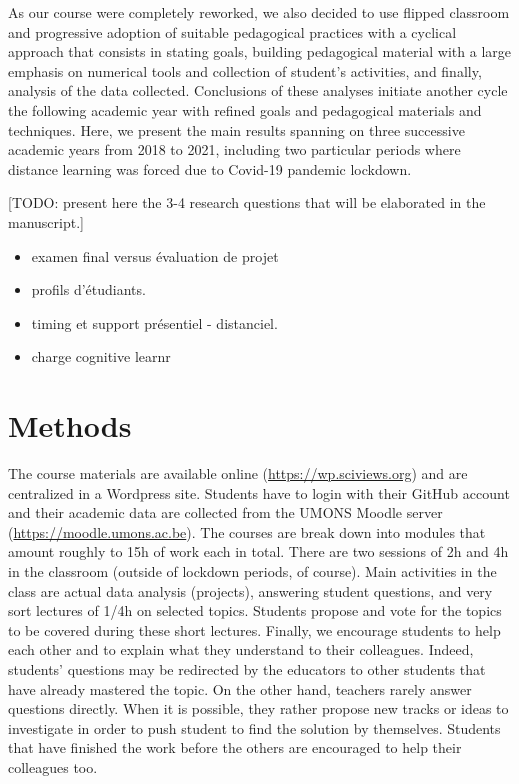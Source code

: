 \documentclass[
]{article}
\begin{document}
As our course were completely reworked, we also decided to use flipped
classroom and progressive adoption of suitable pedagogical practices
with a cyclical approach that consists in stating goals, building
pedagogical material with a large emphasis on numerical tools and
collection of student's activities, and finally, analysis of the data
collected. Conclusions of these analyses initiate another cycle the
following academic year with refined goals and pedagogical materials and
techniques. Here, we present the main results spanning on three
successive academic years from 2018 to 2021, including two particular
periods where distance learning was forced due to Covid-19 pandemic
lockdown.

{[}TODO: present here the 3-4 research questions that will be elaborated
in the manuscript.{]}

\begin{itemize}
\item
  examen final versus évaluation de projet
\item
  profils d'étudiants.
\item
  timing et support présentiel - distanciel.
\item
  charge cognitive learnr
\end{itemize}

\hypertarget{methods}{%
\section{Methods}\label{methods}}

The course materials are available online
(\url{https://wp.sciviews.org}) and are centralized in a Wordpress site.
Students have to login with their GitHub account and their academic data
are collected from the UMONS Moodle server
(\url{https://moodle.umons.ac.be}). The courses are break down into
modules that amount roughly to 15h of work each in total. There are two
sessions of 2h and 4h in the classroom (outside of lockdown periods, of
course). Main activities in the class are actual data analysis
(projects), answering student questions, and very sort lectures of 1/4h
on selected topics. Students propose and vote for the topics to be
covered during these short lectures. Finally, we encourage students to
help each other and to explain what they understand to their colleagues.
Indeed, students' questions may be redirected by the educators to other
students that have already mastered the topic. On the other hand,
teachers rarely answer questions directly. When it is possible, they
rather propose new tracks or ideas to investigate in order to push
student to find the solution by themselves. Students that have finished
the work before the others are encouraged to help their colleagues too.
\end{document}
